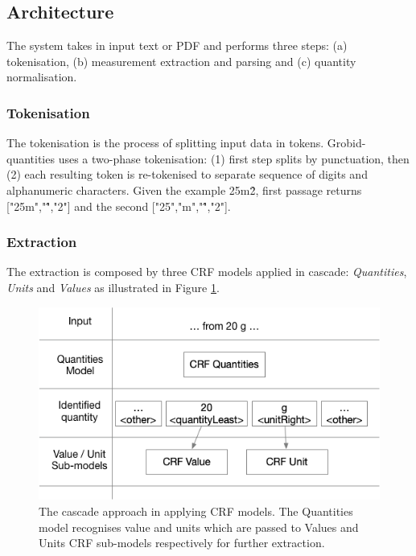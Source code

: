 \documentclass[sigconf]{acmart}
\begin{document}
\subsection{Architecture}
The system takes in input text or PDF and performs three steps: (a) tokenisation, (b) measurement extraction and parsing and (c) quantity normalisation. 

\subsubsection{Tokenisation}
The tokenisation is the process of splitting input data in tokens. Grobid-quantities uses a two-phase tokenisation: (1) first step splits by punctuation, then (2) each resulting token is re-tokenised to separate sequence of digits and alphanumeric characters. Given the example 25m\^2, first passage returns ["25m","\^","2"] and the second ["25","m","\^","2"]. 

\subsubsection{Extraction}
The extraction is composed by three CRF models applied in cascade: \textit{Quantities}, \textit{Units} and \textit{Values} as illustrated in Figure \ref{fig:schema-cascade}.  

\begin{figure}[ht]
  \centering
  \includegraphics[width=\linewidth]{images/schema-cascade}
  \caption{The cascade approach in applying CRF models. The Quantities model recognises value and units which are  passed to Values and Units CRF sub-models respectively for further extraction.}
  \label{fig:schema-cascade}
\end{figure}
\end{document}
